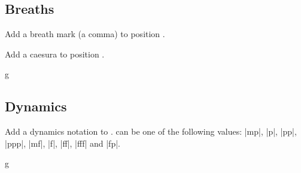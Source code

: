 \subsection{Breaths}\label{sec:inline:breaths}
\begin{command}{\tmbreath{}}
  Add a breath mark (a comma) to position .
\end{command}
\begin{command}{\tmcaesura{}}
  Add a caesura to position .
\end{command}
\begin{codeexample}[]
\begin{tmline}
\begin{tmstaff}{g}{}
\end{tmstaff}
\end{tmline}
\end{codeexample}
\subsection{Dynamics}\label{sec:inline:dynamics}
\begin{command}{\tmdynamics{}}
  Add a dynamics notation to .  can be one of the 
  following values: |mp|, |p|, |pp|, |ppp|, |mf|, |f|, |ff|, |fff| and |fp|.
\end{command}
\begin{codeexample}[]
\begin{tmline}
\begin{tmstaff}{g}{}
\end{tmstaff}
\end{tmline}
\end{codeexample}
